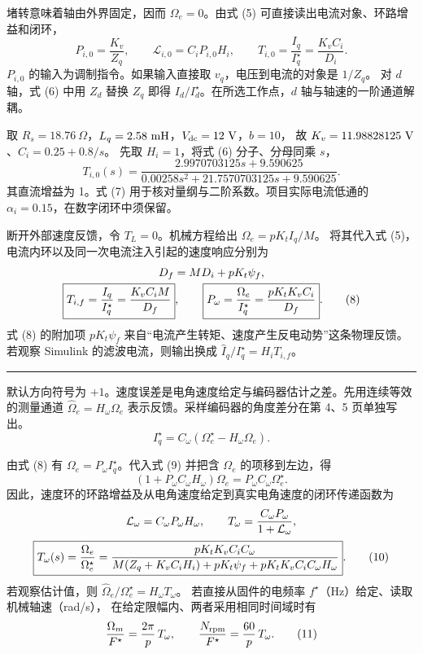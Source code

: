\documentclass[UTF8,fontset=windows,11pt,a4paper]{ctexart}
\newcommand{\titleline}[1]{\noindent{\sffamily\bfseries\fontsize{20}{25}\selectfont #1}\par\vspace{.25em}\hrule\vspace{.45em}}
\newcommand{\subt}[1]{\par\vspace{.55em}{\sffamily\bfseries\large #1}\par\nobreak}
\newcommand{\Ci}{C_i}
\newcommand{\Cw}{C_{\omega}}
\newcommand{\Hi}{H_i}
\newcommand{\Hw}{H_{\omega}}
\newcommand{\we}{\Omega_e}
\newcommand{\Wref}{\Omega_e^\star}
\newcommand{\Iq}{I_q}
\newcommand{\Ir}{I_q^\star}
\newcommand{\Kt}{K_t}
\newcommand{\kv}{K_v}
\newcommand{\psiP}{\psi_f}
\begin{document}
\subt{轴被锁住时，电流给定到实际电流}
堵转意味着轴由外界固定，因而 $\we=0$。由式 (5) 可直接读出电流对象、环路增益和闭环，
\begin{equation}
 P_{i,0}=\frac{\kv}{Z_q},\qquad
 \mathcal L_{i,0}=\Ci P_{i,0}\Hi,\qquad
 \boxed{T_{i,0}=\frac{\Iq}{\Ir}=\frac{\kv\Ci}{D_i}} . \tag{6}
\end{equation}
$P_{i,0}$ 的输入为调制指令。如果输入直接取 $v_q$，电压到电流的对象是 $1/Z_q$。
对 $d$ 轴，式 (6) 中用 $Z_d$ 替换 $Z_q$ 即得 $I_d/I_d^\star$。在所选工作点，$d$ 轴与轴速的一阶通道解耦。

\subt{代入项目默认值的连续算例}
取 $R_s=18.76~\Omega$，$L_q=2.58~{\rm mH}$，$V_{\rm dc}=12~{\rm V}$，$b=10$，
故 $\kv=11.98828125~{\rm V}$、$\Ci=0.25+0.8/s$。
先取 $\Hi=1$，将式 (6) 分子、分母同乘 $s$，
\begin{equation}
 T_{i,0}(s)=
 \frac{2.9970703125s+9.590625}
 {0.00258s^2+21.7570703125s+9.590625}. \tag{7}
\end{equation}
其直流增益为 1。式 (7) 用于核对量纲与二阶系数。项目实际电流低通的 $\alpha_i=0.15$，在数字闭环中须保留。

\subt{转子可以转动时，反电动势随速度变化}
断开外部速度反馈，令 $T_L=0$。机械方程给出 $\we=p\Kt\Iq/M$。
将其代入式 (5)，电流内环以及同一次电流注入引起的速度响应分别为
\begin{gather}
 D_f=M D_i+p\Kt\psiP , \notag\\[-1pt]
 \boxed{T_{i,f}=\frac{\Iq}{\Ir}=\frac{\kv\Ci M}{D_f}},\qquad
 \boxed{P_\omega=\frac{\we}{\Ir}=\frac{p\Kt\kv\Ci}{D_f}}. \tag{8}
\end{gather}
式 (8) 的附加项 $p\Kt\psiP$ 来自“电流产生转矩、速度产生反电动势”这条物理反馈。
若观察 Simulink 的滤波电流，则输出换成 $\widehat I_q/\Ir=\Hi T_{i,f}$。

\newpage
\titleline{3\quad 速度外环}
默认方向符号为 $+1$。速度误差是电角速度给定与编码器估计之差。先用连续等效的测量通道
$\widehat\Omega_e=\Hw\we$ 表示反馈。采样编码器的角度差分在第 4、5 页单独写出。
\begin{equation}
 \Ir=\Cw\!\left(\Wref-\Hw\we\right). \tag{9}
\end{equation}

\subt{从电流给定到整个速度闭环}
由式 (8) 有 $\we=P_\omega\Ir$。代入式 (9) 并把含 $\we$ 的项移到左边，得
\[
 (1+P_\omega\Cw\Hw)\we=P_\omega\Cw\Wref.
\]
因此，速度环的环路增益及从电角速度给定到真实电角速度的闭环传递函数为
\begin{gather}
 \mathcal L_\omega=\Cw P_\omega\Hw,\qquad
 T_\omega=\frac{\Cw P_\omega}{1+\mathcal L_\omega},\notag\\[2pt]
 \boxed{\displaystyle
 T_\omega(s)=\frac{\we}{\Wref}
 =\frac{p\Kt\kv\Ci\Cw}{M(Z_q+\kv\Ci\Hi)+p\Kt\psiP+p\Kt\kv\Ci\Cw\Hw}} .\tag{10}
\end{gather}
若观察估计值，则 $\widehat\Omega_e/\Wref=\Hw T_\omega$。
若直接从固件的电频率 $f^\star$（Hz）给定、读取机械轴速（rad/s），
在给定限幅内、两者采用相同时间域时有
\begin{equation}
 \frac{\Omega_m}{F^\star}=\frac{2\pi}{p}\,T_\omega,\qquad
 \frac{N_{\rm rpm}}{F^\star}=\frac{60}{p}\,T_\omega. \tag{11}
\end{equation}
\end{document}
